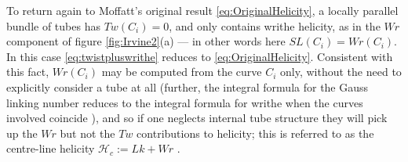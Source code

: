 To return again to Moffatt's original result \eqref{eq:OriginalHelicity}, a locally parallel bundle of tubes has $Tw(C_i) =0$, and only contains writhe helicity, as in the $Wr$ component of figure \ref{fig:Irvine2}(a) --- in other words here $SL(C_i) = Wr(C_i)$. In this case \eqref{eq:twistpluswrithe} reduces to \eqref{eq:OriginalHelicity}. Consistent with this fact, $Wr(C_i)$ may be computed from the curve $C_i$ only, without the need to explicitly consider a tube at all (further, the integral formula for the Gauss linking number reduces to the integral formula for writhe when the curves involved coincide \citep{Moffat1992}), and so if one neglects internal tube structure they will pick up the $Wr$ but not the $Tw$ contributions to helicity; this is referred to as the centre-line helicity $\mathcal{H}_c := Lk +Wr$ \citep{Scheeler2014}.

